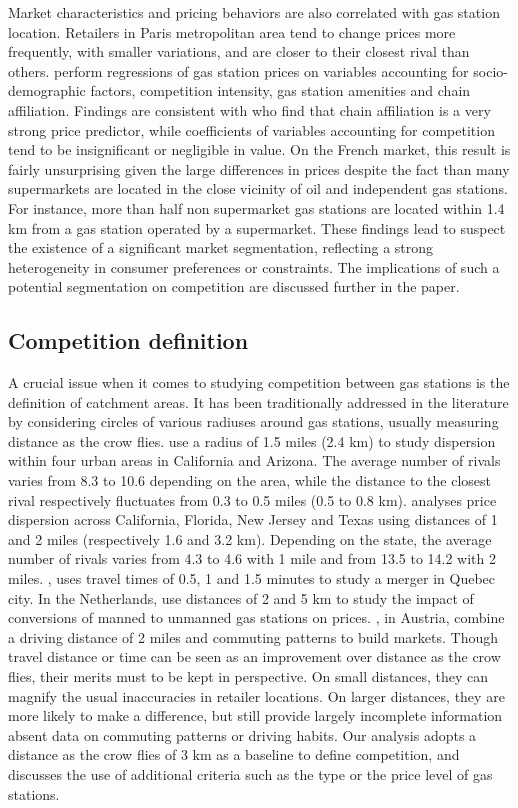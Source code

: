 \documentclass[english]{article}
\begin{document}
Market characteristics and pricing behaviors are also correlated with gas station location. Retailers in Paris metropolitan area tend to change prices more frequently, with smaller variations, and are closer to their closest rival than others. \cite{CHA16} perform regressions of gas station prices on variables accounting for socio-demographic factors, competition intensity, gas station amenities and chain affiliation. Findings are consistent with \cite{HOS08} who find that chain affiliation is a very strong price predictor, while coefficients of variables accounting for competition tend to be insignificant or negligible in value. On the French market, this result is fairly unsurprising given the large differences in prices despite the fact than many supermarkets are located in the close vicinity of oil and independent gas stations. For instance, more than half non supermarket gas stations are located within 1.4 km from a gas station operated by a supermarket. These findings lead to suspect the existence of a significant market segmentation, reflecting a strong heterogeneity in consumer preferences or constraints. The implications of such a potential segmentation on competition are discussed further in the paper.

\subsection{Competition definition}

A crucial issue when it comes to studying competition between gas stations is the definition of catchment areas. It has been traditionally addressed in the literature by considering circles of various radiuses around gas stations, usually measuring distance as the crow flies. \cite{BAR04} use a radius of 1.5 miles (2.4 km) to study dispersion within four urban areas in California and Arizona. The average number of rivals varies from 8.3 to 10.6 depending on the area, while the distance to the closest rival respectively fluctuates from 0.3 to 0.5 miles (0.5 to 0.8 km). \cite{CHA11} analyses price dispersion across California, Florida, New Jersey and Texas using distances of 1 and 2 miles (respectively 1.6 and 3.2 km). Depending on the state, the average number of rivals varies from 4.3 to 4.6 with 1 mile and from 13.5 to 14.2 with 2 miles. \cite{HOU12}, uses travel times of 0.5, 1 and 1.5 minutes to study a merger in Quebec city. In the Netherlands, \cite{BRU15} use distances of 2 and 5 km to study the impact of conversions of manned to unmanned gas stations on prices. \cite{PEN15}, in Austria, combine a driving distance of 2 miles and commuting patterns to build markets.
Though travel distance or time can be seen as an improvement over distance as the crow flies, their merits must to be kept in perspective. On small distances, they can magnify the usual inaccuracies in retailer locations. On larger distances, they are more likely to make a difference, but still provide largely incomplete information absent data on commuting patterns or driving habits. Our analysis adopts a distance as the crow flies of 3 km as a baseline to define competition, and discusses the use of additional criteria such as the type or the price level of gas stations.
\end{document}
